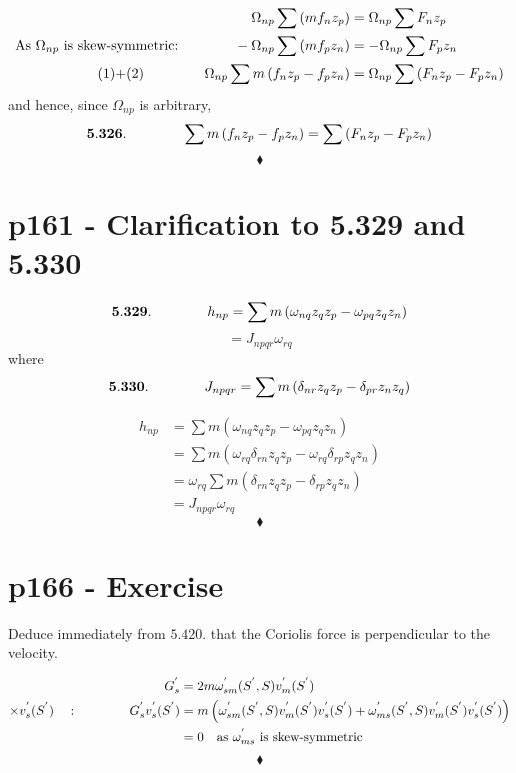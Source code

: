\begin{align}
\Omega_{np}\sum \left(mf_nz_p\right)&= \Omega_{np}\sum F_nz_p \\
\text{As }\Omega_{np}\text{ is skew-symmetric:}\quad\quad\quad\quad -\Omega_{np}\sum \left(mf_pz_n\right)&= -\Omega_{np}\sum F_pz_n \\
\text{(1)+(2) }\quad\quad\quad\quad \Omega_{np}\sum m\left(f_nz_p-f_pz_n\right)&= \Omega_{np}\sum\left( F_nz_p -F_pz_n\right)
\end{align}
and hence, since $\Omega_{np}$ is arbitrary,
$$\mathbf{5.326.}\quad\quad\quad\quad \sum m\left(f_nz_p-f_pz_n\right)= \sum \left(F_nz_p-F_pz_n \right)$$
$$\blacklozenge$$
\newpage

\section{p161 - Clarification to 5.329 and 5.330}
\begin{tcolorbox}
$$\mathbf{5.329.}\quad\quad\quad\quad h_{np}=\sum m\left(\omega_{nq} z_q z_p -\omega_{pq} z_qz_n\right)$$
$$= J_{npqr}\omega_{rq}$$
where
$$\mathbf{5.330.}\quad\quad\quad\quad J_{npqr}= \sum m\left(\delta_{nr}z_qz_p-\delta_{pr}z_nz_q \right)$$
\end{tcolorbox}
\begin{align}
h_{np}&=\sum m\left(\omega_{nq} z_q z_p -\omega_{pq} z_qz_n\right)\\
&=\sum m\left(\omega_{rq}\delta_{rn} z_q z_p -\omega_{rq} \delta_{rp}z_qz_n\right)\\
&=\omega_{rq}\sum m\left(\delta_{rn} z_q z_p -\delta_{rp}z_qz_n\right)\\
&=J_{npqr}\omega_{rq}
\end{align}
$$\blacklozenge$$
\newpage


\section{p166 - Exercise}
\begin{tcolorbox}
Deduce immediately from $\mathbf{5.420.}$ that the Coriolis force is perpendicular to the velocity.
\end{tcolorbox}
\begin{align}
G^{'}_s &= 2m\omega^{'}_{sm}(S^{'},S)v^{'}_m(S^{'})\\
\times v^{'}_s(S^{'})\quad : \quad\quad\quad\quad G^{'}_s v^{'}_s(S^{'})&=m\left(\omega^{'}_{sm}(S^{'},S)v^{'}_m(S^{'})v^{'}_s(S^{'})+\omega^{'}_{ms}(S^{'},S)v^{'}_m(S^{'})v^{'}_s(S^{'})\right)\\
&=0\quad\text{as }\omega^{'}_{ms}\text{ is skew-symmetric}
\end{align}
$$\blacklozenge$$
\newpage

